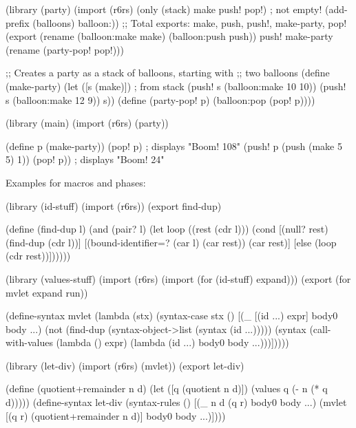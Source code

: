 \documentclass{monograph}
\begin{document}
(library (party)
  (import (r6rs)
          (only (stack) make push! pop!) ; not empty!
          (add-prefix (balloons) balloon:))
  ;; Total exports: make, push, push!, make-party, pop!
  (export (rename (balloon:make make)
	          (balloon:push push))
	  push!
	  make-party
	  (rename (party-pop! pop!)))

  ;; Creates a party as a stack of balloons, starting with
  ;;  two balloons
  (define (make-party)
    (let ([s (make)]) ; from stack
      (push! s (balloon:make 10 10))
      (push! s (balloon:make 12 9))
      s))
  (define (party-pop! p)
    (balloon:pop (pop! p))))


(library (main)
  (import (r6rs) (party))

  (define p (make-party))
  (pop! p)        ; displays "Boom! 108"
  (push! p (push (make 5 5) 1))
  (pop! p))       ; displays "Boom! 24"
\endschemedisplay

Examples for macros and phases:

\schemedisplay
(library (id-stuff)
  (import (r6rs))
  (export find-dup)

  (define (find-dup l)
    (and (pair? l)
         (let loop ((rest (cdr l)))
           (cond
            [(null? rest) (find-dup (cdr l))]
            [(bound-identifier=? (car l) (car rest)) (car rest)]
            [else (loop (cdr rest))])))))

(library (values-stuff)
  (import (r6rs) (import (for (id-stuff) expand)))
  (export (for mvlet expand run))

  (define-syntax mvlet
    (lambda (stx)
      (syntax-case stx ()
        [(_ [(id ...) expr] body0 body ...)
         (not (find-dup (syntax-object->list (syntax (id ...)))))
         (syntax (call-with-values (lambda () expr) 
                                   (lambda (id ...) body0 body ...)))]))))

(library (let-div)
  (import (r6rs) (mvlet))
  (export let-div)

  (define (quotient+remainder n d)
    (let ([q (quotient n d)])
      (values q (- n (* q d)))))
  (define-syntax let-div
    (syntax-rules ()
     [(_ n d (q r) body0 body ...)
      (mvlet [(q r) (quotient+remainder n d)]
        body0 body ...)])))
\endschemedisplay
\end{document}
